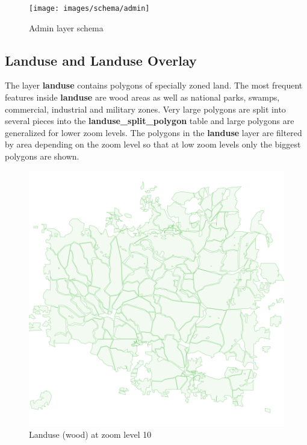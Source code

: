 \vspace{20}

\begin{figure}[H]
  \centering
  \texttt{[image: images/schema/admin]}
  \caption{Admin layer schema}
\end{figure}

\subsection{Landuse and Landuse Overlay}

\noindent\begin{minipage}[t]{0.48\linewidth}
    \vspace{0pt}
    The layer \textbf{landuse} contains polygons of specially zoned land. The most frequent 
    features inside \textbf{landuse} are wood areas as well as national parks, swamps, commercial, industrial and military zones.
    Very large polygons are split into several pieces into the \textbf{landuse\_split\_polygon} table and large polygons are generalized
    for lower zoom levels. The polygons in the \textbf{landuse} layer are filtered by area depending on the zoom level so that at low zoom levels only the biggest polygons are shown.
\end{minipage}
\hfill
\begin{minipage}[t]{0.48\linewidth}
    \vspace{-20pt}
    \begin{figure}[H]
      \includegraphics[width=1\textwidth]{images/schema/landuse_example}
      \caption{Landuse (wood) at zoom level 10}
    \end{figure}
\end{minipage}

